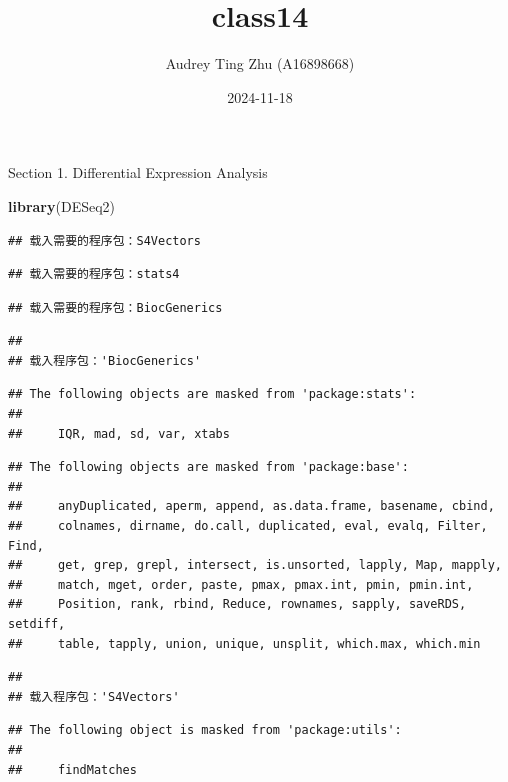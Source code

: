 \documentclass[
]{article}
\title{class14}
\author{Audrey Ting Zhu (A16898668)}
\date{2024-11-18}
\newenvironment{Shaded}{\begin{snugshade}}{\end{snugshade}}
\newcommand{\FunctionTok}[1]{\textcolor[rgb]{0.13,0.29,0.53}{\textbf{#1}}}
\newcommand{\NormalTok}[1]{#1}
\begin{document}
\maketitle

Section 1. Differential Expression Analysis

\begin{Shaded}
\begin{Highlighting}[]
\FunctionTok{library}\NormalTok{(DESeq2)}
\end{Highlighting}
\end{Shaded}

\begin{verbatim}
## 载入需要的程序包：S4Vectors
\end{verbatim}

\begin{verbatim}
## 载入需要的程序包：stats4
\end{verbatim}

\begin{verbatim}
## 载入需要的程序包：BiocGenerics
\end{verbatim}

\begin{verbatim}
## 
## 载入程序包：'BiocGenerics'
\end{verbatim}

\begin{verbatim}
## The following objects are masked from 'package:stats':
## 
##     IQR, mad, sd, var, xtabs
\end{verbatim}

\begin{verbatim}
## The following objects are masked from 'package:base':
## 
##     anyDuplicated, aperm, append, as.data.frame, basename, cbind,
##     colnames, dirname, do.call, duplicated, eval, evalq, Filter, Find,
##     get, grep, grepl, intersect, is.unsorted, lapply, Map, mapply,
##     match, mget, order, paste, pmax, pmax.int, pmin, pmin.int,
##     Position, rank, rbind, Reduce, rownames, sapply, saveRDS, setdiff,
##     table, tapply, union, unique, unsplit, which.max, which.min
\end{verbatim}

\begin{verbatim}
## 
## 载入程序包：'S4Vectors'
\end{verbatim}

\begin{verbatim}
## The following object is masked from 'package:utils':
## 
##     findMatches
\end{verbatim}
\end{document}

